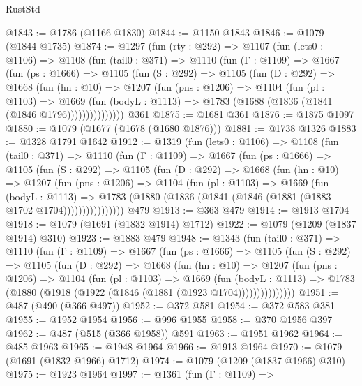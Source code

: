 \begin{lexlean}{RustStd}
\begin{coremodule}
@1843 := @1786 (@1166 @1830)
@1844 := @1150 @1843
@1846 := @1079 (@1844 @1735)
@1874 := @1297
    (fun (rty : @292) =>
    @1107
      (fun (lets0 : @1106) =>
      @1108
        (fun (tail0 : @371) =>
        @1110
          (fun (Γ : @1109) =>
          @1667
            (fun (ps : @1666) =>
            @1105
              (fun (S : @292) =>
              @1105
                (fun (D : @292) =>
                @1668
                  (fun (hn : @10) =>
                  @1207
                    (fun (pns : @1206) =>
                    @1104
                      (fun (pl : @1103) =>
                      @1669
                        (fun (bodyL : @1113) =>
                        @1783 (@1688 (@1836 (@1841 (@1846 @1796)))))))))))))))
    @361
@1875 := @1681 @361
@1876 := @1875 @1097
@1880 := @1079 (@1677 (@1678 (@1680 @1876)))
@1881 := @1738 @1326
@1883 := @1328 @1791 @1642
@1912 := @1319
    (fun (lets0 : @1106) =>
    @1108
      (fun (tail0 : @371) =>
      @1110
        (fun (Γ : @1109) =>
        @1667
          (fun (ps : @1666) =>
          @1105
            (fun (S : @292) =>
            @1105
              (fun (D : @292) =>
              @1668
                (fun (hn : @10) =>
                @1207
                  (fun (pns : @1206) =>
                  @1104
                    (fun (pl : @1103) =>
                    @1669
                      (fun (bodyL : @1113) =>
                      @1783 (@1880 (@1836 (@1841 (@1846 (@1881 (@1883 @1702 @1704))))))))))))))))
    @479
@1913 := @363 @479
@1914 := @1913 @1704
@1918 := @1079 (@1691 (@1832 @1914) @1712)
@1922 := @1079 (@1209 (@1837 @1914) @310)
@1923 := @1883 @479
@1948 := @1343
    (fun (tail0 : @371) =>
    @1110
      (fun (Γ : @1109) =>
      @1667
        (fun (ps : @1666) =>
        @1105
          (fun (S : @292) =>
          @1105
            (fun (D : @292) =>
            @1668
              (fun (hn : @10) =>
              @1207
                (fun (pns : @1206) =>
                @1104
                  (fun (pl : @1103) =>
                  @1669
                    (fun (bodyL : @1113) =>
                    @1783 (@1880 (@1918 (@1922 (@1846 (@1881 (@1923 @1704)))))))))))))))
@1951 := @487 (@490 (@366 @497))
@1952 := @372 @581
@1954 := @372 @583 @381
@1955 := @1952 @1954
@1956 := @996 @1955
@1958 := @370 @1956 @397
@1962 := @487 (@515 (@366 @1958)) @591
@1963 := @1951 @1962
@1964 := @485 @1963
@1965 := @1948 @1964
@1966 := @1913 @1964
@1970 := @1079 (@1691 (@1832 @1966) @1712)
@1974 := @1079 (@1209 (@1837 @1966) @310)
@1975 := @1923 @1964
@1997 := @1361
    (fun (Γ : @1109) =>

\end{coremodule}
\end{lexlean}
